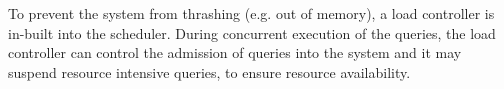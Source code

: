 To prevent the system from thrashing (e.g. out of memory), a load controller is in-built into the scheduler.
During concurrent execution of the queries, the load controller can control the admission of queries into the system and it may suspend resource intensive queries, to ensure resource availability.  %


